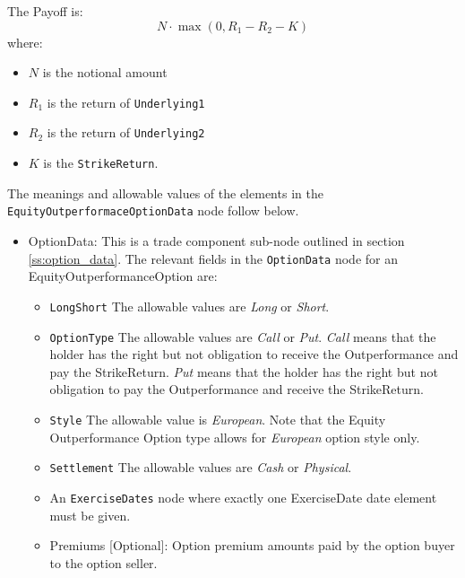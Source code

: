 The Payoff is:
$$
N\cdot \max(0,R_1-R_2 - K)
$$
where:
\begin{itemize}
  \item $N$ is the notional amount
  \item $R_1$ is the return of \lstinline!Underlying1!
  \item $R_2$ is the return of \lstinline!Underlying2!
  \item $K$ is the \lstinline!StrikeReturn!.
\end{itemize}
The meanings and allowable values of the elements in the \lstinline!EquityOutperformaceOptionData!  node follow below.

\begin{itemize}
\item OptionData: This is a trade component sub-node outlined in section \ref{ss:option_data}. The relevant fields in the \lstinline!OptionData! node for an EquityOutperformanceOption are:

\begin{itemize}
\item \lstinline!LongShort! The allowable values are \emph{Long} or \emph{Short}.

\item \lstinline!OptionType! The allowable values are \emph{Call} or \emph{Put}.  \emph{Call} means that the holder has the right but not obligation to receive the Outperformance and pay the StrikeReturn. \emph{Put} means that the holder has the right but not obligation to pay the Outperformance and receive the StrikeReturn.

\item  \lstinline!Style! The allowable value is \emph{European}. Note that the Equity Outperformance Option type allows for \emph{European} option style only. 

\item  \lstinline!Settlement! The allowable values are \emph{Cash} or \emph{Physical}.


\item An \lstinline!ExerciseDates! node where exactly one ExerciseDate date element must be given. 

\item Premiums [Optional]: Option premium amounts paid by the option buyer to the option seller.


\end{itemize}
\end{itemize}
